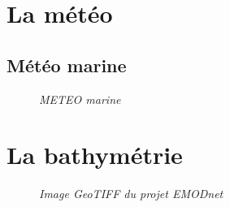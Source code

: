 \chapter{La météo}
\section{Météo marine}
\begin{center}
\begin{figure}[ht]
\caption{\label{equiProj}\textit{METEO {\sc marine}}}
\end{figure}
\end{center}

\chapter{La bathymétrie}
\begin{center}
\begin{figure}[ht]
\caption{\label{equiProj}\textit{Image GeoTIFF du projet EMODnet}}
\end{figure}
\end{center}
